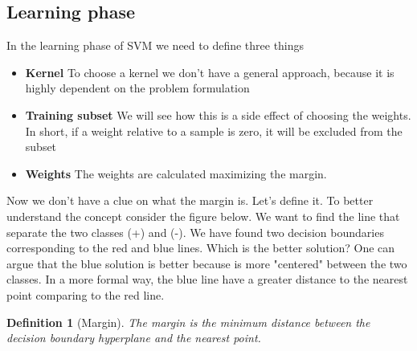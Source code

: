 \documentclass[main.tex]{subfiles}
\newtheorem{definition}{Definition}[section]
\begin{document}
\subsection{Learning phase}
In the learning phase of SVM we need to define three things
\begin{itemize}
    \item \textbf{Kernel} To choose a kernel we don't have a general approach, because it is highly dependent on the problem formulation
    \item \textbf{Training subset} We will see how this is a side effect of choosing the weights. In short, if a weight relative to a sample is zero, it will be excluded from the subset
    \item \textbf{Weights} The weights are calculated maximizing the margin.
\end{itemize}
Now we don't have a clue on what the margin is. Let's define it.
To better understand the concept consider the figure below. We want to find the line that separate the two classes (+) and (-). We have found two decision boundaries corresponding to the red and blue lines. Which is the better solution? One can argue that the blue solution is better because is more "centered" between the two classes. In a more formal way, the blue line have a greater distance to the nearest point comparing to the red line.
\begin{definition}[Margin]
    The margin is the minimum distance between the decision boundary hyperplane and the nearest point.
\end{definition}
\end{document}
